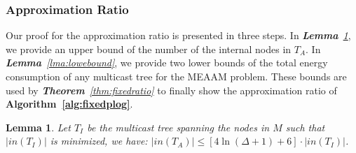\documentclass[10pt, conference, compsocconf]{IEEEtran}
\newtheorem{lemma}{\textbf{Lemma}}
\begin{document}
    \subsubsection{Approximation Ratio} Our proof for the approximation ratio is presented in three steps. In \textit{\textbf{Lemma}~\ref{lma:inner}}, we provide an upper bound of the number of the internal nodes in $T_A$. In \textit{\textbf{Lemma}~\ref{lma:lowebound}}, we provide two lower bounds of the total energy consumption of any multicast tree for the MEAAM problem. These bounds are used by \textit{\textbf{Theorem}~\ref{thm:fixedratio}} to finally show the approximation ratio of \textbf{Algorithm~\ref{alg:fixedplog}}.
\begin{lemma}
Let $T_I$ be the multicast tree spanning the nodes in $M$ such that $|\mathit{in}(T_I)|$ is minimized, we have: $|\mathit{in}({T_A})| \le \left[4\ln (\Delta+1)+6\right] \cdot |in({T_I})|$.
      \label{lma:inner}
\end{lemma}
\end{document}
